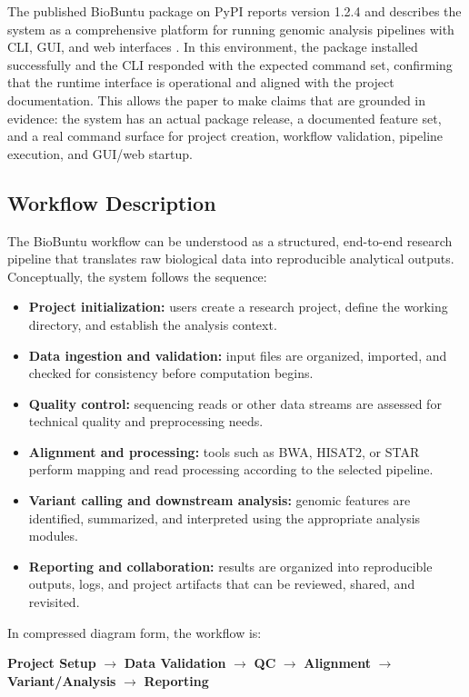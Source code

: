 \documentclass[10pt,conference]{IEEEtran}
\begin{document}
The published BioBuntu package on PyPI reports version 1.2.4 and describes the system as a comprehensive platform for running genomic analysis pipelines with CLI, GUI, and web interfaces \cite{biobuntuPyPI2024}. In this environment, the package installed successfully and the CLI responded with the expected command set, confirming that the runtime interface is operational and aligned with the project documentation. This allows the paper to make claims that are grounded in evidence: the system has an actual package release, a documented feature set, and a real command surface for project creation, workflow validation, pipeline execution, and GUI/web startup.

\subsection{Workflow Description}

The BioBuntu workflow can be understood as a structured, end-to-end research pipeline that translates raw biological data into reproducible analytical outputs. Conceptually, the system follows the sequence:

\begin{itemize}[leftmargin=*]
    \item \textbf{Project initialization:} users create a research project, define the working directory, and establish the analysis context.
    \item \textbf{Data ingestion and validation:} input files are organized, imported, and checked for consistency before computation begins.
    \item \textbf{Quality control:} sequencing reads or other data streams are assessed for technical quality and preprocessing needs.
    \item \textbf{Alignment and processing:} tools such as BWA, HISAT2, or STAR perform mapping and read processing according to the selected pipeline.
    \item \textbf{Variant calling and downstream analysis:} genomic features are identified, summarized, and interpreted using the appropriate analysis modules.
    \item \textbf{Reporting and collaboration:} results are organized into reproducible outputs, logs, and project artifacts that can be reviewed, shared, and revisited.
\end{itemize}

In compressed diagram form, the workflow is:

\begin{center}
\textbf{Project Setup} $\rightarrow$ \textbf{Data Validation} $\rightarrow$ \textbf{QC} $\rightarrow$ \textbf{Alignment} $\rightarrow$ \textbf{Variant/Analysis} $\rightarrow$ \textbf{Reporting}
\end{center}
\end{document}
